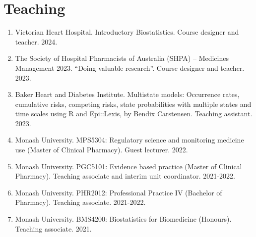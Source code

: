 \documentclass[11pt]{article}
\begin{document}
\section*{Teaching}
\begin{enumerate}
\item Victorian Heart Hospital. Introductory Biostatistics. Course designer and teacher. 2024.
\item The Society of Hospital Pharmacists of Australia (SHPA) – Medicines Management 2023. ``Doing valuable research''. Course designer and teacher. 2023.
\item Baker Heart and Diabetes Institute. Multistate models: Occurrence rates, cumulative risks, 
competing risks, state probabilities with multiple states and time scales using R and Epi::Lexis, by Bendix Carstensen. Teaching assistant. 2023.
\item Monash University. MPS5304: Regulatory science and monitoring medicine use (Master of Clinical Pharmacy). Guest lecturer. 2022.
\item Monash University. PGC5101: Evidence based practice (Master of Clinical Pharmacy). Teaching associate and interim unit coordinator. 2021-2022.
\item Monash University. PHR2012: Professional Practice IV (Bachelor of Pharmacy). Teaching associate. 2021-2022.
\item Monash University. BMS4200: Biostatistics for Biomedicine (Honours). Teaching associate. 2021.
\end{enumerate}
\end{document}
